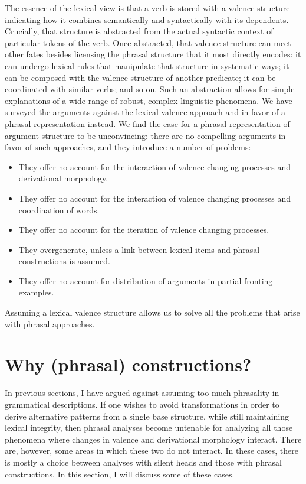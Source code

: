 \begin{exe}
\begin{xlist}[iv.]
\begin{exe}
\begin{xlist}[iv.]
The essence of the lexical view is that a verb is stored with a valence structure indicating how it
combines semantically and syntactically with its dependents.  Crucially, that structure is
abstracted from the actual syntactic context of particular tokens of the verb.  Once abstracted,
that valence structure can meet other fates besides licensing the phrasal structure that it most
directly encodes: it can undergo lexical rules that manipulate that structure in systematic ways; it
can be composed with the valence structure of another predicate; it can be coordinated with similar
verbs; and so on.  Such an abstraction allows for simple explanations of a wide range of
robust, complex linguistic phenomena.  We have surveyed the arguments against the lexical valence
approach and in favor of a phrasal representation instead.  We find the case for a phrasal
representation of argument structure to be unconvincing: there are no compelling arguments in favor
of such approaches, and they introduce a number of problems:
\begin{itemize}
\item They offer no account for the interaction of valence changing processes and derivational morphology.
\item They offer no account for the interaction of valence changing processes and coordination of words.
\item They offer no account for the iteration of valence changing processes.
\item They overgenerate, unless a link between lexical items and phrasal constructions is assumed.
\item They offer no account for distribution of arguments in partial fronting examples.
\end{itemize}
Assuming a lexical valence structure
allows us to solve all the problems that arise with phrasal approaches.



\section{Why (phrasal) constructions?}
\label{Abschnitt-Phrasale-Konstruktionen}\label{sec-why-phrasal}

In previous sections, I have argued against assuming too much phrasality in grammatical descriptions.
If one wishes to avoid transformations in order to derive alternative patterns from a single base structure, while still maintaining lexical integrity,
then phrasal analyses become untenable for analyzing all those phenomena where changes in valence and derivational morphology interact. There are, however, some areas
in which these two do not interact. In these cases, there is mostly a choice between analyses with silent heads and those with phrasal constructions. In this section,
I will discuss some of these cases.


\end{xlist}
\end{exe}
\end{xlist}
\end{exe}

